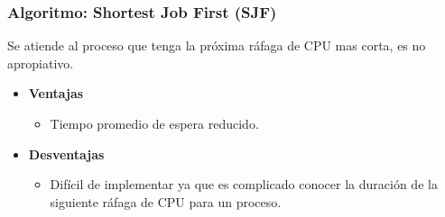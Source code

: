 \documentclass{beamer}
\newcommand{\algTitle}{\textbf{Algoritmo}: }
\begin{document}
\begin{frame}
\frametitle{\algTitle Shortest Job First (SJF)}
Se atiende al proceso que tenga la próxima ráfaga de CPU mas corta, es no apropiativo.

\begin{itemize}
	\item \textbf{Ventajas}
	\begin{itemize}
		\item Tiempo promedio de espera reducido.
	\end{itemize}
	\vspace{0.5cm}
	
	\item \textbf{Desventajas}
	\begin{itemize}
		\item Difícil de implementar ya que es complicado conocer la duración de la siguiente ráfaga
		de CPU para un proceso.
	\end{itemize}
\end{itemize}
\end{frame}
\end{document}
